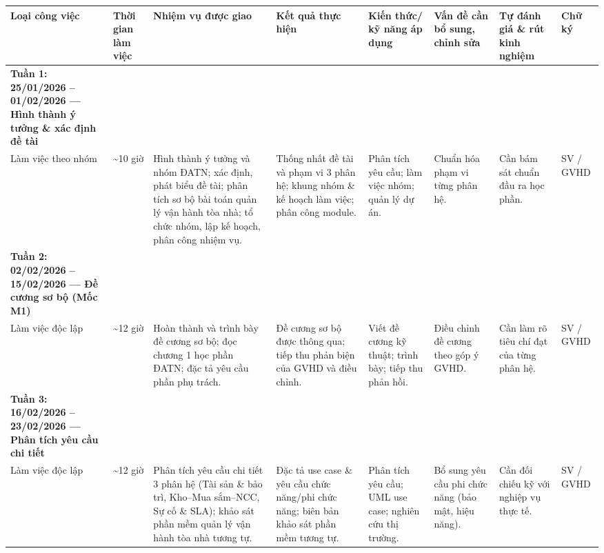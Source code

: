 \begin{landscape}{\footnotesize\singlespacing\renewcommand{\arraystretch}{1.25}\setlength{\LTleft}{0pt}\setlength{\LTright}{0pt}
\begin{longtable}{|>{\raggedright\arraybackslash}p{}|>{\raggedright\arraybackslash}p{}|>{\raggedright\arraybackslash}p{}|>{\raggedright\arraybackslash}p{}|>{\raggedright\arraybackslash}p{}|>{\raggedright\arraybackslash}p{}|>{\raggedright\arraybackslash}p{}|>{\raggedright\arraybackslash}p{}|}
\hline
\textbf{Loại công việc} & \textbf{Thời gian làm việc} & \textbf{Nhiệm vụ được giao} & \textbf{Kết quả thực hiện} & \textbf{Kiến thức/​kỹ năng áp dụng} & \textbf{Vấn đề cần bổ sung, chỉnh sửa} & \textbf{Tự đánh giá \& rút kinh nghiệm} & \textbf{Chữ ký} \\ \hline
\endhead
\textbf{Tuần 1: 25/01/2026 – 01/02/2026 — Hình thành ý tưởng \& xác định đề tài} &  &  &  &  &  &  &  \\ \hline
Làm việc theo nhóm & \textasciitilde{}10 giờ & Hình thành ý tưởng và nhóm ĐATN; xác định, phát biểu đề tài; phân tích sơ bộ bài toán quản lý vận hành tòa nhà; tổ chức nhóm, lập kế hoạch, phân công nhiệm vụ. & Thống nhất đề tài và phạm vi 3 phân hệ; khung nhóm \& kế hoạch làm việc; phân công module. & Phân tích yêu cầu; làm việc nhóm; quản lý dự án. & Chuẩn hóa phạm vi từng phân hệ. & Cần bám sát chuẩn đầu ra học phần. & SV / GVHD \\ \hline
\textbf{Tuần 2: 02/02/2026 – 15/02/2026 — Đề cương sơ bộ (Mốc M1)} &  &  &  &  &  &  &  \\ \hline
Làm việc độc lập & \textasciitilde{}12 giờ & Hoàn thành và trình bày đề cương sơ bộ; đọc chương 1 học phần ĐATN; đặc tả yêu cầu phần phụ trách. & Đề cương sơ bộ được thông qua; tiếp thu phản biện của GVHD và điều chỉnh. & Viết đề cương kỹ thuật; trình bày; tiếp thu phản hồi. & Điều chỉnh đề cương theo góp ý GVHD. & Cần làm rõ tiêu chí đạt của từng phân hệ. & SV / GVHD \\ \hline
\textbf{Tuần 3: 16/02/2026 – 23/02/2026 — Phân tích yêu cầu chi tiết} &  &  &  &  &  &  &  \\ \hline
Làm việc độc lập & \textasciitilde{}12 giờ & Phân tích yêu cầu chi tiết 3 phân hệ (Tài sản \& bảo trì, Kho–Mua sắm–NCC, Sự cố \& SLA); khảo sát phần mềm quản lý vận hành tòa nhà tương tự. & Đặc tả use case \& yêu cầu chức năng/phi chức năng; biên bản khảo sát phần mềm tương tự. & Phân tích yêu cầu; UML use case; nghiên cứu thị trường. & Bổ sung yêu cầu phi chức năng (bảo mật, hiệu năng). & Cần đối chiếu kỹ với nghiệp vụ thực tế. & SV / GVHD \\ \hline

\end{longtable}}
\end{landscape}
